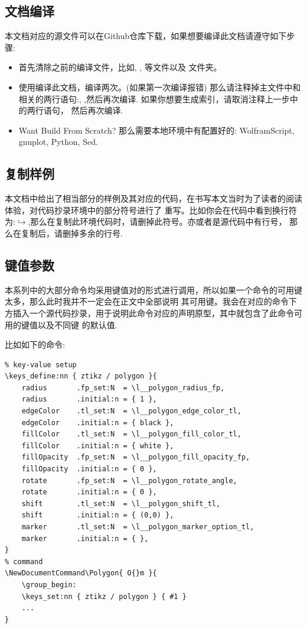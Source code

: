 \subsection{文档编译}
本文档对应的源文件可以在Github仓库下载，如果想要编译此文档请遵守如下步骤:
\begin{itemize}
    \item 首先清除之前的编译文件，比如, , 等文件以及
        文件夹。
    \item 使用编译此文档，编译两次。(如果第一次编译报错)
        那么请注释掉主文件中和相关的两行语句:\cmd{\makeindex[]{}},
        \cmd{\printindex[]{}},然后再次编译. 如果你想要生成索引，请取消注释上一步中的两行语句，
        然后再次编译.
    \item Want Build From Scratch? 那么需要本地环境中有配置好的: WolframScript, gnuplot, Python, Sed.
\end{itemize}

\subsection{复制样例}
本文档中给出了相当部分的样例及其对应的代码，在书写本文当时为了读者的阅读体验，对代码抄录环境中的部分符号进行了
重写。比如你会在代码中看到换行符为:$\hookrightarrow$,那么在复制此环境代码时，请删掉此符号。亦或者是源代码中有行号，
那么在复制后，请删掉多余的行号.

\subsection{键值参数}
本系列中的大部分命令均采用键值对的形式进行调用，所以如果一个命令的可用键太多，那么此时我并不一定会在正文中全部说明
其可用键。我会在对应的命令下方插入一个源代码抄录，用于说明此命令对应的声明原型，其中就包含了此命令可用的键值以及不同键
的默认值.

比如如下的命令:
\begin{verbatim}
% key-value setup
\keys_define:nn { ztikz / polygon }{
    radius       .fp_set:N  = \l__polygon_radius_fp,
    radius       .initial:n = { 1 },
    edgeColor    .tl_set:N  = \l__polygon_edge_color_tl,
    edgeColor    .initial:n = { black },
    fillColor    .tl_set:N  = \l__polygon_fill_color_tl,
    fillColor    .initial:n = { white },
    fillOpacity  .fp_set:N  = \l__polygon_fill_opacity_fp,
    fillOpacity  .initial:n = { 0 },
    rotate       .fp_set:N  = \l__polygon_rotate_angle,
    rotate       .initial:n = { 0 },
    shift        .tl_set:N  = \l__polygon_shift_tl,
    shift        .initial:n = { (0,0) },
    marker       .tl_set:N  = \l__polygon_marker_option_tl,
    marker       .initial:n = { },
}
% command
\NewDocumentCommand\Polygon{ O{}m }{
    \group_begin:
    \keys_set:nn { ztikz / polygon } { #1 }
    ... 
}
\end{verbatim}


